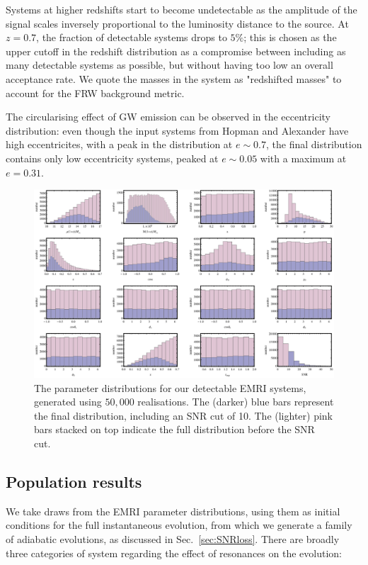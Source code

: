 \documentclass[aps,prd,amsfonts,amssymb,amsmath,nofootinbib,reprint,showpacs]{revtex4}
\newcommand{\secref}[1]{Sec.\ \ref{sec:#1}}
\begin{document}
Systems at higher redshifts start to become undetectable as the amplitude of the signal scales inversely proportional to the luminosity distance to the source. At $z=0.7$, the fraction of detectable systems drops to $5\%$; this is chosen as the upper cutoff in the redshift distribution as a compromise between including as many detectable systems as possible, but without having too low an overall acceptance rate. We quote the masses in the system as "redshifted masses" to account for the FRW background metric.

The circularising effect of GW emission can be observed in the eccentricity distribution: even though the input systems from Hopman and Alexander have high eccentricites, with a peak in the distribution at $e\sim0.7$, the final distribution contains only low eccentricity systems, peaked at $e\sim0.05$ with a maximum at $e=0.31$.

\begin{figure}[htbp]
\centering
\includegraphics[width=\textwidth]{Fig_EMRIpar_dists}
\caption{\label{fig:EMRIpar-dists}The parameter distributions for our detectable EMRI systems, generated using $50,000$ realisations. The (darker) blue bars represent the final distribution, including an SNR cut of 10. The (lighter) pink bars stacked on top indicate the full distribution before the SNR cut.}
\end{figure}

\subsection{Population results}

We take draws from the EMRI parameter distributions, using them as initial conditions for the full instantaneous evolution, from which we generate a family of adiabatic evolutions, as discussed in \secref{SNRloss}. There are broadly three categories of system regarding the effect of resonances on the evolution:
\end{document}
